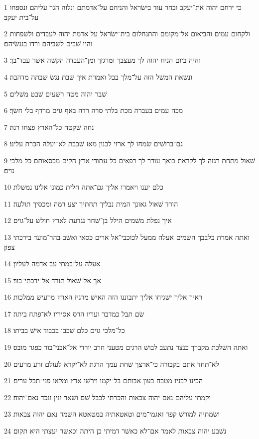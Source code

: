 \par 1 כי ירחם יהוה את־יעקב ובחר עוד בישׂראל והניחם על־אדמתם ונלוה הגר עליהם ונספחו על־בית יעקב׃
\par 2 ולקחום עמים והביאום אל־מקומם והתנחלום בית־ישׂראל על אדמת יהוה לעבדים ולשׁפחות והיו שׁבים לשׁביהם ורדו בנגשׂיהם׃
\par 3 והיה ביום הניח יהוה לך מעצבך ומרגזך ומן־העבדה הקשׁה אשׁר עבד־בך׃
\par 4 ונשׂאת המשׁל הזה על־מלך בבל ואמרת איך שׁבת נגשׂ שׁבתה מדהבה׃
\par 5 שׁבר יהוה מטה רשׁעים שׁבט משׁלים׃
\par 6 מכה עמים בעברה מכת בלתי סרה רדה באף גוים מרדף בלי חשׂך׃
\par 7 נחה שׁקטה כל־הארץ פצחו רנה׃
\par 8 גם־ברושׁים שׂמחו לך ארזי לבנון מאז שׁכבת לא־יעלה הכרת עלינו׃
\par 9 שׁאול מתחת רגזה לך לקראת בואך עורר לך רפאים כל־עתודי ארץ הקים מכסאותם כל מלכי גוים׃
\par 10 כלם יענו ויאמרו אליך גם־אתה חלית כמונו אלינו נמשׁלת׃
\par 11 הורד שׁאול גאונך המית נבליך תחתיך יצע רמה ומכסיך תולעה׃
\par 12 איך נפלת משׁמים הילל בן־שׁחר נגדעת לארץ חולשׁ על־גוים׃
\par 13 ואתה אמרת בלבבך השׁמים אעלה ממעל לכוכבי־אל ארים כסאי ואשׁב בהר־מועד בירכתי צפון׃
\par 14 אעלה על־במתי עב אדמה לעליון׃
\par 15 אך אל־שׁאול תורד אל־ירכתי־בור׃
\par 16 ראיך אליך ישׁגיחו אליך יתבוננו הזה האישׁ מרגיז הארץ מרעישׁ ממלכות׃
\par 17 שׂם תבל כמדבר ועריו הרס אסיריו לא־פתח ביתה׃
\par 18 כל־מלכי גוים כלם שׁכבו בכבוד אישׁ בביתו׃
\par 19 ואתה השׁלכת מקברך כנצר נתעב לבושׁ הרגים מטעני חרב יורדי אל־אבני־בור כפגר מובס׃
\par 20 לא־תחד אתם בקבורה כי־ארצך שׁחת עמך הרגת לא־יקרא לעולם זרע מרעים׃
\par 21 הכינו לבניו מטבח בעון אבותם בל־יקמו וירשׁו ארץ ומלאו פני־תבל ערים׃
\par 22 וקמתי עליהם נאם יהוה צבאות והכרתי לבבל שׁם ושׁאר ונין ונכד נאם־יהוה׃
\par 23 ושׂמתיה למורשׁ קפד ואגמי־מים וטאטאתיה במטאטא השׁמד נאם יהוה צבאות׃
\par 24 נשׁבע יהוה צבאות לאמר אם־לא כאשׁר דמיתי כן היתה וכאשׁר יעצתי היא תקום׃
